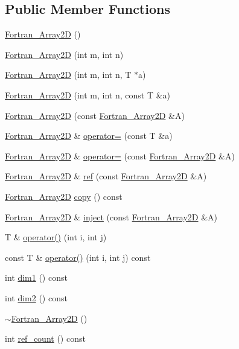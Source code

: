 \subsection*{Public Member Functions}
\begin{DoxyCompactItemize}
\item 
\hyperlink{classTNT_1_1Fortran__Array2D_a6c439794238043682b4b5901521534ac}{Fortran\+\_\+\+Array2D} ()
\item 
\hyperlink{classTNT_1_1Fortran__Array2D_af5d192c5865a587f3e49de6e321c6483}{Fortran\+\_\+\+Array2D} (int m, int n)
\item 
\hyperlink{classTNT_1_1Fortran__Array2D_a8953e98e6c7ebdfaec743be1194638a0}{Fortran\+\_\+\+Array2D} (int m, int n, T $\ast$a)
\item 
\hyperlink{classTNT_1_1Fortran__Array2D_af81c83ddf0df807410c624814ee829c2}{Fortran\+\_\+\+Array2D} (int m, int n, const T \&a)
\item 
\hyperlink{classTNT_1_1Fortran__Array2D_ae4537235bf543fe4034f0e8e4ffbdfe7}{Fortran\+\_\+\+Array2D} (const \hyperlink{classTNT_1_1Fortran__Array2D}{Fortran\+\_\+\+Array2D} \&A)
\item 
\hyperlink{classTNT_1_1Fortran__Array2D}{Fortran\+\_\+\+Array2D} \& \hyperlink{classTNT_1_1Fortran__Array2D_ae9d02fc21095e4cd2fff9f479d52a2b4}{operator=} (const T \&a)
\item 
\hyperlink{classTNT_1_1Fortran__Array2D}{Fortran\+\_\+\+Array2D} \& \hyperlink{classTNT_1_1Fortran__Array2D_aa4aa0816e95aadc83366b9faa77ba643}{operator=} (const \hyperlink{classTNT_1_1Fortran__Array2D}{Fortran\+\_\+\+Array2D} \&A)
\item 
\hyperlink{classTNT_1_1Fortran__Array2D}{Fortran\+\_\+\+Array2D} \& \hyperlink{classTNT_1_1Fortran__Array2D_a3367c5ff1caa02a1f3676b125f2accf5}{ref} (const \hyperlink{classTNT_1_1Fortran__Array2D}{Fortran\+\_\+\+Array2D} \&A)
\item 
\hyperlink{classTNT_1_1Fortran__Array2D}{Fortran\+\_\+\+Array2D} \hyperlink{classTNT_1_1Fortran__Array2D_a0486e25f2caa7291bcf025167c780e50}{copy} () const
\item 
\hyperlink{classTNT_1_1Fortran__Array2D}{Fortran\+\_\+\+Array2D} \& \hyperlink{classTNT_1_1Fortran__Array2D_a893c3e37cf3f590705340c476bb75f3c}{inject} (const \hyperlink{classTNT_1_1Fortran__Array2D}{Fortran\+\_\+\+Array2D} \&A)
\item 
T \& \hyperlink{classTNT_1_1Fortran__Array2D_ad285fd42092b4815d69c2aad73a5bb30}{operator()} (int i, int j)
\item 
const T \& \hyperlink{classTNT_1_1Fortran__Array2D_add7274a47eff2f7d458eb89d8b715493}{operator()} (int i, int j) const
\item 
int \hyperlink{classTNT_1_1Fortran__Array2D_ad47134ab6502c9c86a7a84a780916ef4}{dim1} () const
\item 
int \hyperlink{classTNT_1_1Fortran__Array2D_aac2d118c850caab27fdcbc7a66baabed}{dim2} () const
\item 
\hyperlink{classTNT_1_1Fortran__Array2D_a8a687f53f3ceab1579d00d372402e9b0}{$\sim$\+Fortran\+\_\+\+Array2D} ()
\item 
int \hyperlink{classTNT_1_1Fortran__Array2D_a86c14fd24e1943b267a16f83d572739d}{ref\+\_\+count} () const
\end{DoxyCompactItemize}
